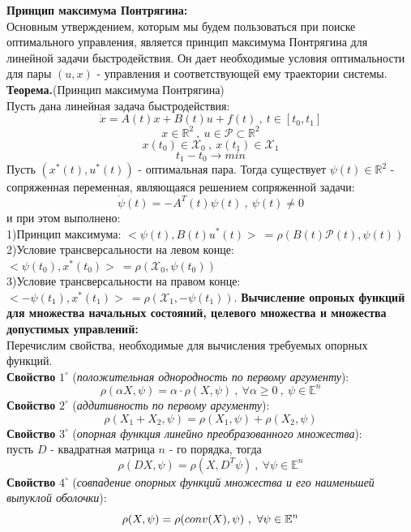 \documentclass[10pt]{article}
\begin{document}
\textbf{Принцип максимума Понтрягина:}\bigskip \\
Основным утверждением, которым мы будем пользоваться при поиске оптимального управления, является принцип максимума Понтрягина для линейной задачи быстродействия. Он дает необходимые условия оптимальности для пары \( (u, x)\) - управления и соответствующей ему траектории системы.\bigskip \\
\textbf{Теорема.}(Принцип максимума Понтрягина)\smallskip\\
Пусть дана линейная задача быстродействия:
\[ \dot{x} = A(t)x + B(t)u + f(t) \ , \ t \in [t_0, t_1]\]
\[x \in \mathbb{R}^2 \ , \ u \in \mathcal{P} \subset \mathbb{R}^2 \]
\[ x(t_0) \in \mathcal{X}_0 \ , \ x(t_1) \in \mathcal{X}_1\]
\[t_1 - t_0 \to min\]
Пусть \( (x^*(t), u^*(t)) \) - оптимальная пара. Тогда существует \( \psi(t) \in \mathbb{R}^2\) - сопряженная переменная, являющаяся решением сопряженной задачи:
\[ \dot{\psi}(t) = -A^T(t) \psi(t) \ , \ \psi(t) \neq 0\]
и при этом выполнено:\medskip\\
1)Принцип максимума:
\( < \psi(t), B(t)u^*(t)>  \ = \rho(B(t) \mathcal{P}(t) , \psi(t))\)\medskip\\
2)Условие трансверсальности на левом конце:
\( < \psi(t_0), x^*(t_0)> \ = \rho(\mathcal{X}_0 , \psi(t_0))\)\medskip\\
3)Условие трансверсальности на правом конце:
\(<-\psi(t_1), x^*(t_1)> \ = \rho(\mathcal{X}_1 , -\psi(t_1)).\)
\newpage
\noindent\textbf{Вычисление опроных функций для множества начальных состояний, целевого множества и множества допустимых управлений:}\bigskip \\
Перечислим свойства, необходимые для вычисления требуемых опорных функций.\medskip\\
\textbf{Свойство} \(1^{\circ}\) (\textit{положительная однородность по первому аргументу}):
\[ \rho( \alpha X, \psi) = \alpha \cdot \rho(X, \psi) \ , \ \forall \alpha \geq 0 \ , \ \psi \in \mathbb{E}^n\]
\textbf{Свойство} \(2^{\circ}\) (\textit{аддитивность по первому аргументу}):
\[ \rho(X_1 + X_2, \psi) = \rho(X_1, \psi) + \rho(X_2, \psi)\]
\textbf{Свойство} \(3^{\circ}\) (\textit{опорная функция линейно преобразованного множества}):\\
пусть \(D\) - квадратная матрица \(n\) - го порядка, тогда
\[ \rho(DX, \psi) = \rho(X, D^T\psi) \ , \ \forall \psi \in \mathbb{E}^n\]
\textbf{Свойство} \(4^{\circ}\) (\textit{совпадение опорных функций множества и его наименьшей выпуклой оболочки}):
\[ \rho(X,\psi) = \rho(conv (X), \psi) \ , \ \forall \psi \in \mathbb{E}^n \bigskip \]
\end{document}
